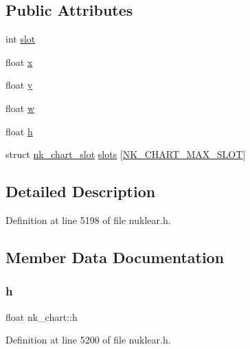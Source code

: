 \subsection*{Public Attributes}
\begin{DoxyCompactItemize}
\item 
int \mbox{\hyperlink{structnk__chart_a7efbaddcc43ef4b3a74e843c2fad9efb}{slot}}
\item 
float \mbox{\hyperlink{structnk__chart_a62ce20cad6ebcb59d5d7a5033fb0cdbc}{x}}
\item 
float \mbox{\hyperlink{structnk__chart_ab412562c43ee5deec5ae0527325089f4}{y}}
\item 
float \mbox{\hyperlink{structnk__chart_acc9a21d99c3d518b74e736a0bee2f699}{w}}
\item 
float \mbox{\hyperlink{structnk__chart_a7c8799e3f091c21a8df50290d5a69d45}{h}}
\item 
struct \mbox{\hyperlink{structnk__chart__slot}{nk\+\_\+chart\+\_\+slot}} \mbox{\hyperlink{structnk__chart_abd217868acd2a20d1ff27914156573ac}{slots}} \mbox{[}\mbox{\hyperlink{nuklear_8h_acb2e713edfb3e50211b1fd67d38529be}{N\+K\+\_\+\+C\+H\+A\+R\+T\+\_\+\+M\+A\+X\+\_\+\+S\+L\+OT}}\mbox{]}
\end{DoxyCompactItemize}


\subsection{Detailed Description}


Definition at line 5198 of file nuklear.\+h.



\subsection{Member Data Documentation}
\mbox{\label{structnk__chart_a7c8799e3f091c21a8df50290d5a69d45}} 
\subsubsection{\texorpdfstring{h}{h}}
{\footnotesize\ttfamily float nk\+\_\+chart\+::h}



Definition at line 5200 of file nuklear.\+h.

\mbox{\label{structnk__chart_a7efbaddcc43ef4b3a74e843c2fad9efb}} 
